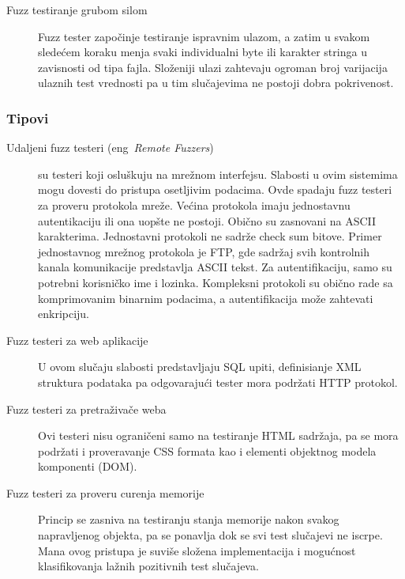 \documentclass[a4paper]{article}
\begin{document}
{\begin{description}
\item[Fuzz testiranje grubom silom]
Fuzz tester započinje testiranje ispravnim ulazom, a zatim u svakom sledećem koraku menja svaki individualni byte ili karakter stringa u zavisnosti od tipa fajla. Složeniji ulazi zahtevaju ogroman broj varijacija ulaznih test vrednosti pa u tim slučajevima ne postoji dobra pokrivenost.
\end{description}

\subsubsection{Tipovi}
\label{subsubsec:tipovi_fuzz_testiranja}
\begin{description}
\item[Udaljeni fuzz testeri  (eng~{\em Remote Fuzzers}) ] su testeri koji osluškuju na mrežnom interfejsu. Slabosti u ovim sistemima mogu dovesti do pristupa osetljivim podacima. Ovde spadaju fuzz testeri za proveru protokola mreže. Većina protokola
imaju jednostavnu autentikaciju ili ona uopšte ne postoji. Obično su zasnovani na ASCII karakterima. Jednostavni protokoli ne sadrže check sum bitove. Primer jednostavnog mrežnog protokola je FTP, gde sadržaj svih kontrolnih kanala komunikacije predstavlja ASCII tekst. Za autentifikaciju, samo su potrebni korisničko ime i lozinka.
Kompleksni protokoli su obično rade sa komprimovanim binarnim podacima, a autentifikacija može zahtevati enkripciju.
\\

\item[Fuzz testeri za web aplikacije] 
U ovom slučaju slabosti predstavljaju SQL upiti, definisianje XML struktura podataka pa odgovarajući tester mora podržati HTTP protokol.
\\

\item[Fuzz testeri za pretraživače weba]
Ovi testeri nisu ograničeni samo na testiranje HTML sadržaja, pa se mora podržati i proveravanje CSS formata kao i elementi objektnog modela komponenti (DOM).
\\

\item[Fuzz testeri za proveru curenja memorije]
Princip se zasniva na testiranju stanja memorije nakon svakog napravljenog objekta, pa se ponavlja dok se svi test slučajevi ne iscrpe. Mana ovog pristupa je suviše složena implementacija i mogućnost klasifikovanja lažnih pozitivnih test slučajeva.
\\


\end{description}}
\end{document}
